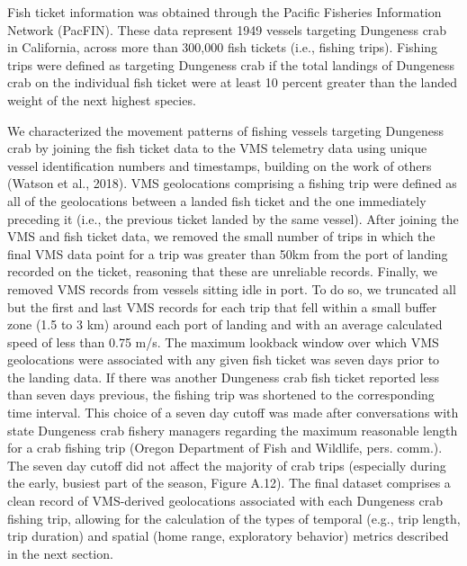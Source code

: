 \documentclass[]{elsarticle} %
\begin{document}
Fish ticket information was obtained through the Pacific Fisheries
Information Network (PacFIN). These data represent 1949 vessels
targeting Dungeness crab in California, across more than 300,000 fish
tickets (i.e., fishing trips). Fishing trips were defined as targeting
Dungeness crab if the total landings of Dungeness crab on the individual
fish ticket were at least 10 percent greater than the landed weight of
the next highest species.

We characterized the movement patterns of fishing vessels targeting
Dungeness crab by joining the fish ticket data to the VMS telemetry data
using unique vessel identification numbers and timestamps, building on
the work of others (Watson et al., 2018). VMS geolocations comprising a
fishing trip were defined as all of the geolocations between a landed
fish ticket and the one immediately preceding it (i.e., the previous
ticket landed by the same vessel). After joining the VMS and fish ticket
data, we removed the small number of trips in which the final VMS data
point for a trip was greater than 50km from the port of landing recorded
on the ticket, reasoning that these are unreliable records. Finally, we
removed VMS records from vessels sitting idle in port. To do so, we
truncated all but the first and last VMS records for each trip that fell
within a small buffer zone (1.5 to 3 km) around each port of landing and
with an average calculated speed of less than 0.75 m/s. The maximum
lookback window over which VMS geolocations were associated with any
given fish ticket was seven days prior to the landing data. If there was
another Dungeness crab fish ticket reported less than seven days
previous, the fishing trip was shortened to the corresponding time
interval. This choice of a seven day cutoff was made after conversations
with state Dungeness crab fishery managers regarding the maximum
reasonable length for a crab fishing trip (Oregon Department of Fish and
Wildlife, pers. comm.). The seven day cutoff did not affect the majority
of crab trips (especially during the early, busiest part of the season,
Figure A.12). The final dataset comprises a clean record of VMS-derived
geolocations associated with each Dungeness crab fishing trip, allowing
for the calculation of the types of temporal (e.g., trip length, trip
duration) and spatial (home range, exploratory behavior) metrics
described in the next section.
\end{document}
